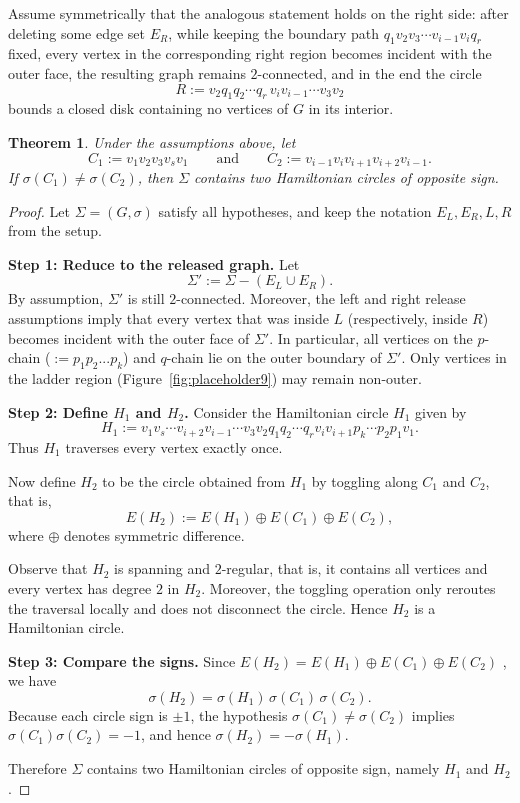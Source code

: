 \documentclass[12pt]{amsart}
\theoremstyle{theorem}%
\newtheorem{theorem}{Theorem}[section]
\theoremstyle{definition}%
\begin{document}
Assume symmetrically that the analogous statement holds on the right side: after deleting some edge set
$E_R$, while keeping the boundary path $q_1v_2v_3\cdots v_{i-1}v_iq_r$ fixed, every vertex in the corresponding
right region becomes incident with the outer face, the resulting graph remains $2$-connected, and in the end the circle
\[
R:=v_2q_1q_2\cdots q_r\,v_i v_{i-1}\cdots v_3v_2
\]
bounds a closed disk containing no vertices of $G$ in its interior.

\begin{theorem}\label{thm:opposite-signs-give-two-ham}
Under the assumptions above, let
\[
C_1:=v_1v_2v_3v_sv_1
\qquad\text{and}\qquad
C_2:=v_{i-1}v_iv_{i+1}v_{i+2}v_{i-1}.
\]
If $\sigma(C_1)\neq \sigma(C_2)$, then $\Sigma$ contains two Hamiltonian circles of opposite sign.
\end{theorem}

\begin{proof}
Let $\Sigma=(G,\sigma)$ satisfy all hypotheses, and keep the notation $E_L,E_R,L,R$ from the setup.

\medskip
\noindent\textbf{Step 1: Reduce to the released graph.}
Let
\[
\Sigma':=\Sigma-(E_L\cup E_R).
\]
By assumption, $\Sigma'$ is still $2$-connected. Moreover, the left and right release assumptions imply that every
vertex that was  inside $L$ (respectively, inside $R$) becomes incident with the outer face of
$\Sigma'$. In particular, all vertices on the $p$-chain ($:=p_1p_2...p_k$) and $q$-chain lie on the outer boundary of $\Sigma'$.
Only vertices in the ladder region (Figure~\ref{fig:placeholder9}) may remain non-outer.

\medskip
\noindent\textbf{Step 2: Define $H_1$ and $H_2$.}
Consider the Hamiltonian circle $H_1$ given  by
\[
H_1 := v_1v_s\cdots v_{i+2}v_{i-1}\cdots v_3v_2q_1q_2\cdots q_rv_iv_{i+1}p_k\cdots p_2p_1v_1.
\]
Thus $H_1$ traverses every vertex exactly once.

Now define $H_2$ to be the circle obtained from $H_1$ by toggling along $C_1$ and $C_2$, that is,
\[
E(H_2):=E(H_1)\oplus E(C_1)\oplus E(C_2),
\]
where $\oplus$ denotes symmetric difference.

\medskip
Observe that $H_2$ is spanning and $2$-regular, that is, it contains all vertices and every vertex has degree $2$ in $H_2$.
Moreover, the toggling operation only reroutes the traversal locally and does not disconnect the circle.
Hence $H_2$ is a Hamiltonian circle.





\medskip
\noindent\textbf{Step 3: Compare the signs.}
Since $E(H_2)=E(H_1)\oplus E(C_1)\oplus E(C_2)$ , we have
\[
\sigma(H_2)=\sigma(H_1)\,\sigma(C_1)\,\sigma(C_2).
\]
Because each circle sign is $\pm1$, the hypothesis $\sigma(C_1)\neq \sigma(C_2)$ implies
$\sigma(C_1)\sigma(C_2)=-1$, and hence $\sigma(H_2)=-\sigma(H_1)$.

Therefore $\Sigma$ contains two Hamiltonian circles of opposite sign, namely $H_1$ and $H_2$.

\end{proof}
\end{document}
